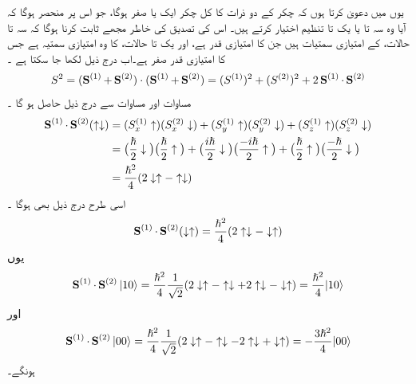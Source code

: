 یوں میں دعویٰ کرتا ہوں کہ  چکر کے دو ذرات کا کل چکر ایک   یا صفر   ہوگا،  جو اس پر منحصر ہوگا کہ آیا وہ  سہ تا  یا  یک تا  تنظیم   اختیار کرتے ہیں۔ اس کی تصدیق  کی خاطر مجھے ثابت کرنا ہوگا کہ سہ تا  حالات،   کے امتیازی سمتیات ہیں  جن کا امتیازی قدر  ہے، اور یک تا حالات،   کا وہ امتیازی سمتیہ ہے جس کا امتیازی قدر صفر ہے۔اب  درج ذیل لکھا جا سکتا ہے ۔
\begin{align}\label{مساوات_تین_ابعادی_مربع_ایس_سادہ}
S^2 = (\operatorname{\mathbf{S}}^{(1)} + \operatorname{\mathbf{S}}^{(2)}) \cdot (\operatorname{\mathbf{S}}^{(1)} + \operatorname{\mathbf{S}}^{(2)}) = (S^{(1)})^2 + (S^{(2)})^2 + 2 \operatorname{\mathbf{S}}^{(1)} \cdot \operatorname{\mathbf{S}}^{(2)}
\end{align}
مساوات   اور مساوات  سے درج ذیل حاصل ہو گا ۔
\begin{align*}
\operatorname{\mathbf{S}}^{(1)} \cdot \operatorname{\mathbf{S}}^{(2)} (\uparrow \downarrow) &= (S_x^{(1)} \uparrow) (S_x^{(2)} \downarrow) + (S_y^{(1)} \uparrow) (S_y^{(2)} \downarrow) + (S_z^{(1)} \uparrow) (S_z^{(2)} \downarrow) \\
&= \big ( \frac{\hslash}{2} \downarrow \big ) \big ( \frac{\hslash}{2} \uparrow \big ) + \big ( \frac{i \hslash}{2} \downarrow \big ) \big ( \frac{- i \hslash}{2} \uparrow \big ) + \big ( \frac{\hslash}{2} \uparrow \big ) \big ( \frac{- \hslash}{2} \downarrow \big ) \\
&= \frac{\hslash^2}{4} (2 \downarrow \uparrow - \uparrow \downarrow)
\end{align*}
اسی طرح درج ذیل بھی ہوگا ۔
\begin{align*}
\operatorname{\mathbf{S}}^{(1)} \cdot \operatorname{\mathbf{S}}^{(2)} (\downarrow \uparrow) = \frac{\hslash^2}{4} (2 \uparrow \downarrow - \downarrow \uparrow)
\end{align*}
یوں
\begin{align}
\operatorname{\mathbf{S}}^{(1)} \cdot \operatorname{\mathbf{S}}^{(2)} | 1 0 \rangle = \frac{\hslash^2}{4} \frac{1}{\sqrt{2}} (2 \downarrow \uparrow - \uparrow \downarrow + 2 \uparrow \downarrow - \downarrow \uparrow) = \frac{\hslash^2}{4} | 1 0 \rangle
\end{align}
اور
\begin{align}
\operatorname{\mathbf{S}}^{(1)} \cdot \operatorname{\mathbf{S}}^{(2)} | 0 0 \rangle = \frac{\hslash^2}{4} \frac{1}{\sqrt{2}} (2 \downarrow \uparrow - \uparrow \downarrow - 2 \uparrow \downarrow + \downarrow \uparrow) = -\frac{3\hslash^2}{4} | 0 0 \rangle
\end{align}
ہونگے۔


